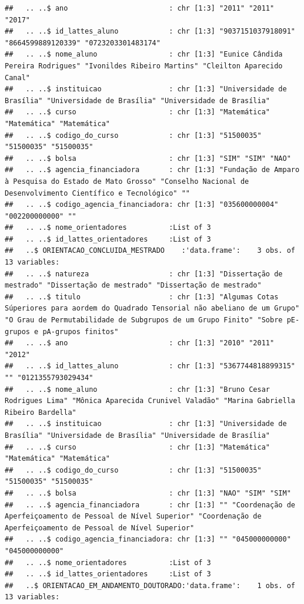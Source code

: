 \documentclass[]{article}
\begin{document}
\begin{verbatim}
##   .. ..$ ano                        : chr [1:3] "2011" "2011" "2017"
##   .. ..$ id_lattes_aluno            : chr [1:3] "9037151037918091" "8664599889120339" "0723203301483174"
##   .. ..$ nome_aluno                 : chr [1:3] "Eunice Cândida Pereira Rodrigues" "Ivonildes Ribeiro Martins" "Cleilton Aparecido Canal"
##   .. ..$ instituicao                : chr [1:3] "Universidade de Brasília" "Universidade de Brasília" "Universidade de Brasília"
##   .. ..$ curso                      : chr [1:3] "Matemática" "Matemática" "Matemática"
##   .. ..$ codigo_do_curso            : chr [1:3] "51500035" "51500035" "51500035"
##   .. ..$ bolsa                      : chr [1:3] "SIM" "SIM" "NAO"
##   .. ..$ agencia_financiadora       : chr [1:3] "Fundação de Amparo à Pesquisa do Estado de Mato Grosso" "Conselho Nacional de Desenvolvimento Científico e Tecnológico" ""
##   .. ..$ codigo_agencia_financiadora: chr [1:3] "035600000004" "002200000000" ""
##   .. ..$ nome_orientadores          :List of 3
##   .. ..$ id_lattes_orientadores     :List of 3
##   ..$ ORIENTACAO_CONCLUIDA_MESTRADO    :'data.frame':    3 obs. of  13 variables:
##   .. ..$ natureza                   : chr [1:3] "Dissertação de mestrado" "Dissertação de mestrado" "Dissertação de mestrado"
##   .. ..$ titulo                     : chr [1:3] "Algumas Cotas Súperiores para aordem do Quadrado Tensorial não abeliano de um Grupo" "O Grau de Permutabilidade de Subgrupos de um Grupo Finito" "Sobre pE-grupos e pA-grupos finitos"
##   .. ..$ ano                        : chr [1:3] "2010" "2011" "2012"
##   .. ..$ id_lattes_aluno            : chr [1:3] "5367744818899315" "" "0121355793029434"
##   .. ..$ nome_aluno                 : chr [1:3] "Bruno Cesar Rodrigues Lima" "Mônica Aparecida Crunivel Valadão" "Marina Gabriella Ribeiro Bardella"
##   .. ..$ instituicao                : chr [1:3] "Universidade de Brasília" "Universidade de Brasília" "Universidade de Brasília"
##   .. ..$ curso                      : chr [1:3] "Matemática" "Matemática" "Matemática"
##   .. ..$ codigo_do_curso            : chr [1:3] "51500035" "51500035" "51500035"
##   .. ..$ bolsa                      : chr [1:3] "NAO" "SIM" "SIM"
##   .. ..$ agencia_financiadora       : chr [1:3] "" "Coordenação de Aperfeiçoamento de Pessoal de Nível Superior" "Coordenação de Aperfeiçoamento de Pessoal de Nível Superior"
##   .. ..$ codigo_agencia_financiadora: chr [1:3] "" "045000000000" "045000000000"
##   .. ..$ nome_orientadores          :List of 3
##   .. ..$ id_lattes_orientadores     :List of 3
##   ..$ ORIENTACAO_EM_ANDAMENTO_DOUTORADO:'data.frame':    1 obs. of  13 variables:

\end{verbatim}
\end{document}
